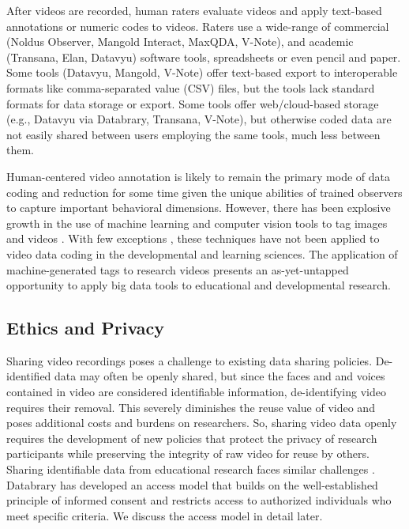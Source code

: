 \documentclass[letterpaper,man,apacite]{apa6}
\begin{document}
After videos are recorded, human raters evaluate videos and apply text-based annotations or numeric codes to videos.
Raters use a wide-range of commercial (Noldus Observer, Mangold Interact, MaxQDA, V-Note), and academic (Transana, Elan, Datavyu) software tools, spreadsheets or even pencil and paper.
Some tools (Datavyu, Mangold, V-Note) offer text-based export to interoperable formats like comma-separated value (CSV) files, but the tools lack standard formats for data storage or export.
Some tools offer web/cloud-based storage (e.g., Datavyu via Databrary, Transana, V-Note), but otherwise coded data are not easily shared between users employing the same tools, much less between them.

Human-centered video annotation is likely to remain the primary mode of data coding and reduction for some time given the unique abilities of trained observers to capture important behavioral dimensions.
However, there has been explosive growth in the use of machine learning and computer vision tools to tag images and videos \cite{Google2014}. 
With few exceptions \cite{Amso2014,ChenYu2013,Raudies2014,Fathi2012}, 
these techniques have not been applied to video data coding in the developmental and learning sciences. 
The application of machine-generated tags to research videos presents an as-yet-untapped opportunity to apply big data tools to educational and developmental research.

\subsection{Ethics and Privacy}

Sharing video recordings poses a challenge to existing data sharing policies.
De-identified data \cite{HHS} may often be openly shared, but since the faces and and voices contained in video are considered identifiable information, de-identifying video requires their removal.
This severely diminishes the reuse value of video and poses additional costs and burdens on researchers.
So, sharing video data openly requires the development of new policies that protect the privacy of research participants while preserving the integrity of raw video for reuse by others.
Sharing identifiable data from educational research faces similar challenges \cite{Asilomar2014}. 
Databrary has developed an access model that builds on the well-established principle of informed consent and restricts access to authorized individuals who meet specific criteria.
We discuss the access model in detail later.
\end{document}
